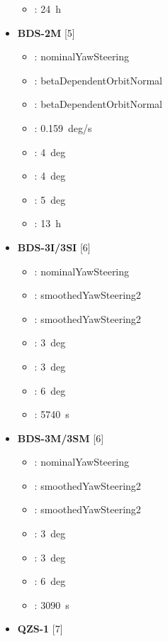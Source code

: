 \begin{itemize}
\begin{itemize}
  \item {}: 24~h
\end{itemize}
\item \textbf{BDS-2M} [5]
\begin{itemize}
  \item {}: nominalYawSteering
  \item {}: betaDependentOrbitNormal
  \item {}: betaDependentOrbitNormal
  \item {}: 0.159~deg/s
  \item {}: 4~deg
  \item {}: 4~deg
  \item {}: 5~deg
  \item {}: 13~h
\end{itemize}
\item \textbf{BDS-3I/3SI} [6]
\begin{itemize}
  \item {}: nominalYawSteering
  \item {}: smoothedYawSteering2
  \item {}: smoothedYawSteering2
  \item {}: 3~deg
  \item {}: 3~deg
  \item {}: 6~deg
  \item {}: 5740~s
\end{itemize}
\item \textbf{BDS-3M/3SM} [6]
\begin{itemize}
  \item {}: nominalYawSteering
  \item {}: smoothedYawSteering2
  \item {}: smoothedYawSteering2
  \item {}: 3~deg
  \item {}: 3~deg
  \item {}: 6~deg
  \item {}: 3090~s
\end{itemize}
\item \textbf{QZS-1} [7]

\end{itemize}
